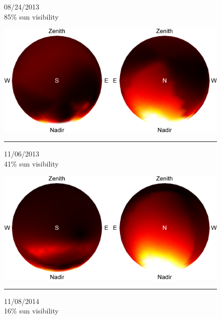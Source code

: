 \begin{figure}[t]
    \centering
    \begin{minipage}{.5\linewidth}
    \begin{sideways}\begin{minipage}{.4\linewidth}\centering \scriptsize 08/24/2013 \\ 85\% sun visibility \vspace{5pt} \end{minipage}\end{sideways}
    \includegraphics[width=.9\linewidth]{./figures/confidenceIntervals/20130824_10pm.png} \\
    \vspace{-.8em} \noindent\rule{\linewidth}{0.1pt}
    \begin{sideways}\begin{minipage}{.4\linewidth}\centering \scriptsize 11/06/2013 \\ 41\% sun visibility \vspace{5pt} \end{minipage}\end{sideways}
    \includegraphics[width=.9\linewidth]{./figures/confidenceIntervals/20131106_10pm.png} \\
    \vspace{-.8em} \noindent\rule{\linewidth}{0.1pt}
    \begin{sideways}\begin{minipage}{.4\linewidth}\centering \scriptsize 11/08/2014 \\ 16\% sun visibility \vspace{5pt} \end{minipage}\end{sideways}

\end{minipage}
\end{figure}
